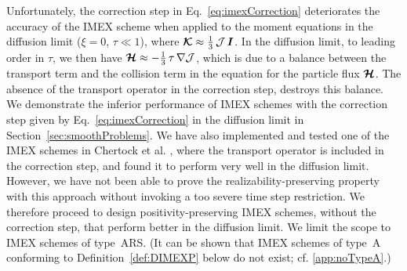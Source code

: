Unfortunately, the correction step in Eq.~\eqref{eq:imexCorrection} deteriorates the accuracy of the IMEX scheme when applied to the moment equations in the diffusion limit ($\xi=0$, $\tau\ll 1$), where $\boldsymbol{\mathcal{K}}\approx\frac{1}{3}\,\mathcal{J}\,\boldsymbol{I}$.  
In the diffusion limit, to leading order in $\tau$, we then have $\boldsymbol{\mathcal{H}}\approx-\frac{1}{3}\,\tau\,\nabla\mathcal{J}$, which is due to a balance between the transport term and the collision term in the equation for the particle flux $\boldsymbol{\mathcal{H}}$.  
The absence of the transport operator in the correction step, destroys this balance.  
We demonstrate the inferior performance of IMEX schemes with the correction step given by Eq.~\eqref{eq:imexCorrection} in the diffusion limit in Section~\ref{sec:smoothProblems}.  
We have also implemented and tested one of the IMEX schemes in Chertock et al. \cite{chertock_etal_2015}, where the transport operator is included in the correction step, and found it to perform very well in the diffusion limit.  
However, we have not been able to prove the realizability-preserving property with this approach without invoking a too severe time step restriction.  
We therefore proceed to design positivity-preserving IMEX schemes, without the correction step, that perform better in the diffusion limit.  
We limit the scope to IMEX schemes of type~ARS.  
(It can be shown that IMEX schemes of type~A conforming to Definition~\ref{def:DIMEXP} below do not exist; cf. \ref{app:noTypeA}.)

